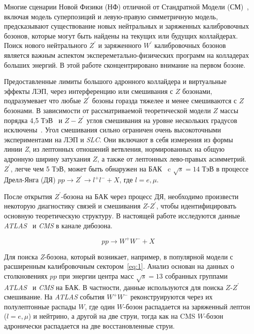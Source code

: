 Многие сценарии Новой Физики (НФ) отличной от Стандратной Модели (СМ)~\cite{2part-1}, включая модель суперпозиций и левую-правую симметричную модель, предсказывают существование новых нейтральных и заряженных калибровочных бозонов, которые могут быть найдены на текущих или будущих коллайдерах. Поиск нового нейтрального $Z^\prime$ и заряженного $W^\prime$ калибровочных бозонов является важным аспектом экспереметально-физических программ на колладерах больших энергий. В этой работе сконцентрировано внимание на первом бозоне.

Предоставленные лимиты большого адронного коллайдера и виртуальные эффекты ЛЭП, через интерференцию или смешивания с $Z$ бозонами, подразумевает что любые $Z^\prime$ бозоны горазда тяжелее и менее смешиваются с $Z$ бозонами. В зависимости от рассматриваемой теоретической модели $Z$ массы порядка 4,5 ТэВ~\cite{2part-pankov} и $Z-Z^\prime$ углов смешивания на уровне нескольких градусов исключены~\cite{sirunyan:2017}. Угол смешивания сильно ограничен очень высокоточными экспериментами на ЛЭП и \textit{SLC}. Они включают в себя измерения из формы линии \textit{Z}, из лептонных отношений ветвления, нормированных на общую адронную ширину затухания $Z$, а также от лептонных лево-правых асимметрий. $Z^\prime$, легче чем 5 ТэВ, может быть обнаружен на БАК~\cite{sirunyan:2017} c $\sqrt{s} = 14 $ ТэВ в процессе Дрелл-Янга (ДЯ) $pp \rightarrow Z^\prime \rightarrow l^+l^- + X$, где $l=e,\mu$.

После открытия $Z^\prime$-бозона на БАК через процесс ДЯ, необходимо произвести некоторую диагностику связей и смешивания $Z$-$Z^\prime$, чтобы идентифицировать основную теоретическую структуру. В настоящей работе исследуются данные \textit{ATLAS}~\cite{main-book} и \textit{CMS} в канале дибозона.

\begin{equation} \label{eq:1}
pp \rightarrow W^+W^- + X
\end{equation}

Для поиска \textit{Z}-бозона, который возникает, например, в популярной модели с расширенным калибровочным сектором~\ref{eq:1}. Анализ основан на данных о столкновениях $pp$ при энергии центра масс $\sqrt{s} = 13 $ собранных группами \textit{ATLAS}~\cite{main-book} и \textit{CMS} на БАК. В частности, данные используются для поиска $Z$-$Z^\prime$ смешивание. На \textit{ATLAS} события $W^+W^-$ реконструируются через их полулептонные распады $W$, где один $W$-бозон распадается на заряженный лептон ($l=e,\mu$) и нейтрино, а другой на две струи, тогда как на CMS $W$-бозон адронически распадается на две восстановленные струи. 

